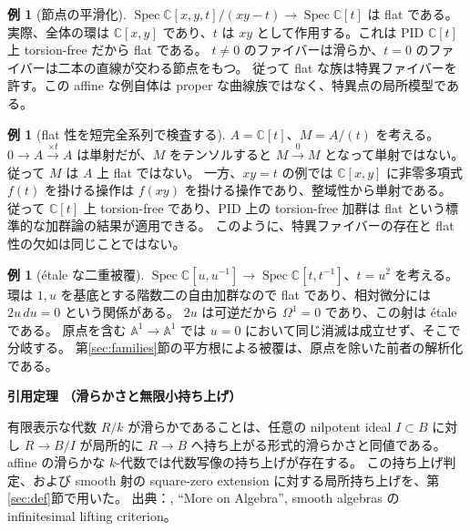 \documentclass[dvipdfmx,a4paper,11pt]{article}
\theoremstyle{definition}
\newtheorem{exa}[thm]{例}
\newcommand{\C}{\mathbb C}\newcommand{\R}{\mathbb R}\newcommand{\Z}{\mathbb Z}\newcommand{\Q}{\mathbb Q}
\DeclareMathOperator{\Spec}{Spec}\DeclareMathOperator{\Proj}{Proj}\DeclareMathOperator{\GL}{GL}
\newcommand{\A}{\mathbb A}
\newenvironment{external}[1]{\Needspace{7\baselineskip}\refstepcounter{thm}\begin{tcolorbox}[mybox,colback=blue!2,colframe=blue!40!black]\textbf{引用定理 \thethm（#1）}\par}{\end{tcolorbox}}
\begin{document}
\begin{exa}[節点の平滑化]
$\Spec\C[x,y,t]/(xy-t)\to\Spec\C[t]$ は flat である。
実際、全体の環は $\C[x,y]$ であり、$t$ は $xy$ として作用する。これは PID $\C[t]$ 上 torsion-free だから flat である。
$t\neq0$ のファイバーは滑らか、$t=0$ のファイバーは二本の直線が交わる節点をもつ。
従って flat な族は特異ファイバーを許す。この affine な例自体は proper な曲線族ではなく、特異点の局所模型である。
\end{exa}

\begin{exa}[flat 性を短完全系列で検査する]
$A=\C[t]$、$M=A/(t)$ を考える。
$0\to A\xrightarrow{\times t}A$ は単射だが、$M$ をテンソルすると $M\xrightarrow{0}M$ となって単射ではない。
従って $M$ は $A$ 上 flat ではない。
一方、$xy=t$ の例では $\C[x,y]$ に非零多項式 $f(t)$ を掛ける操作は $f(xy)$ を掛ける操作であり、整域性から単射である。
従って $\C[t]$ 上 torsion-free であり、PID 上の torsion-free 加群は flat という標準的な加群論の結果が適用できる。
このように、特異ファイバーの存在と flat 性の欠如は同じことではない。
\end{exa}

\begin{exa}[étale な二重被覆]
$\Spec\C[u,u^{-1}]\to\Spec\C[t,t^{-1}]$、$t=u^2$ を考える。
環は $1,u$ を基底とする階数二の自由加群なので flat であり、相対微分には $2u\,du=0$ という関係がある。
$2u$ は可逆だから $\Omega^1=0$ であり、この射は étale である。
原点を含む $\A^1\to\A^1$ では $u=0$ において同じ消滅は成立せず、そこで分岐する。
第\ref{sec:families}節の平方根による被覆は、原点を除いた前者の解析化である。
\end{exa}

\begin{external}{滑らかさと無限小持ち上げ}
有限表示な代数 $R/k$ が滑らかであることは、任意の nilpotent ideal $I\subset B$ に対し $R\to B/I$ が局所的に $R\to B$ へ持ち上がる形式的滑らかさと同値である。
affine の滑らかな $k$-代数では代数写像の持ち上げが存在する。
この持ち上げ判定、および smooth 射の square-zero extension に対する局所持ち上げを、第\ref{sec:def}節で用いた。
出典：\cite{Stacks}, ``More on Algebra'', smooth algebras の infinitesimal lifting criterion。
\end{external}
\end{document}
